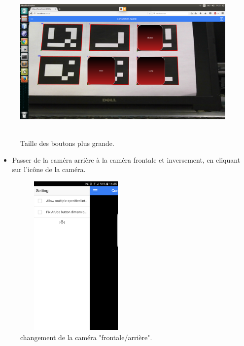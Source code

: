 \documentclass[12pt,a4paper]{article}
\begin{document}
\begin{itemize}
\begin{figure}[H]
  \centering
    \includegraphics[width = 11cm,height=8cm]{3.png}
     \caption{Taille des boutons plus grande.}
     \label{ihm2}
\end{figure}
\begin{itemize}
\item Passer de la caméra arrière à la caméra frontale et inversement, en cliquant sur l’icône de la caméra.
\end{itemize}
\begin{figure}[H]
  \centering
    \includegraphics[width = 6cm,height=8cm]{7.png}
     \caption{changement de la caméra "frontale/arrière".}
\end{figure}
\end{itemize}

\end{document}
